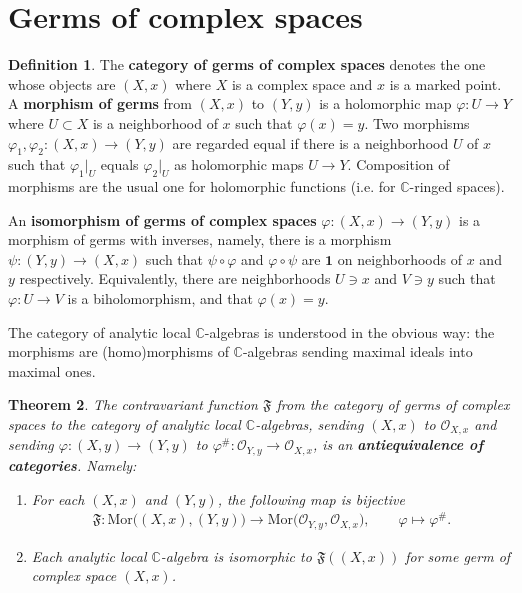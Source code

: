 \documentclass[12pt,b5paper,notitlepage]{report}
\theoremstyle{definition}
\newtheorem{df}{Definition}[section]
\theoremstyle{plain}
\newtheorem{thm}[df]{Theorem}
\newcommand{\fk}{\mathfrak}
\newcommand{\id}{\mathbf{1}}
\newcommand{\scr}{\mathscr}
\newcommand{\Cbb}{\mathbb C}
\newcommand{\Mor}{\mathrm{Mor}}
\numberwithin{equation}{section}
\begin{document}
\section{Germs of complex spaces}


\begin{df}
The \textbf{category of germs of complex spaces} denotes the one whose objects are $(X,x)$ where $X$ is a complex space and $x$ is a marked point. A \textbf{morphism of germs} from $(X,x)$ to $(Y,y)$ is a holomorphic map $\varphi:U\rightarrow Y$ where $U\subset X$ is a neighborhood of $x$ such that $\varphi(x)=y$. Two morphisms $\varphi_1,\varphi_2:(X,x)\rightarrow (Y,y)$ are regarded equal if there is a neighborhood $U$ of $x$ such that $\varphi_1|_U$ equals $\varphi_2|_U$ as holomorphic maps $U\rightarrow Y$. Composition of morphisms are the usual one for holomorphic functions (i.e. for $\Cbb$-ringed spaces). 

An \textbf{isomorphism of germs of complex spaces} $\varphi:(X,x)\rightarrow(Y,y)$ is a morphism of germs with inverses, namely, there is a morphism $\psi:(Y,y)\rightarrow (X,x)$ such that $\psi\circ\varphi$ and $\varphi\circ\psi$ are $\id$ on neighborhoods of $x$ and $y$ respectively. Equivalently, there are neighborhoods $U\ni x$ and $V\ni y$ such that $\varphi:U\rightarrow V$ is a biholomorphism, and that $\varphi(x)=y$. \hfill\qedsymbol
\end{df}




The category of analytic local $\Cbb$-algebras is understood in the obvious way: the morphisms are (homo)morphisms of $\Cbb$-algebras sending maximal ideals into maximal ones.


\begin{thm}\label{lb19}
The contravariant function $\fk F$ from the category of germs of complex spaces to the category of analytic local $\Cbb$-algebras, sending $(X,x)$ to $\scr O_{X,x}$ and sending $\varphi:(X,y)\rightarrow(Y,y)$ to $\varphi^\#:\scr O_{Y,y}\rightarrow\scr O_{X,x}$, is an \textbf{antiequivalence of categories}.  Namely:
\begin{enumerate}[label=(\arabic*)]
\item For each $(X,x)$ and $(Y,y)$, the following map is bijective
\begin{align}
\fk F:\Mor\big((X,x),(Y,y)\big)\rightarrow \Mor\big(\scr O_{Y,y},\scr O_{X,x}\big),\qquad \varphi\mapsto\varphi^\#.\label{eq15}
\end{align}
\item Each analytic local $\Cbb$-algebra is isomorphic to $\fk F((X,x))$ for some germ of complex space $(X,x)$.
\end{enumerate}
\end{thm}
\end{document}
